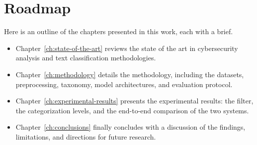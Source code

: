 \section*{Roadmap}\label{sec:roadmap}
Here is an outline of the chapters presented in this work, each with a brief.
\begin{itemize}
    \item Chapter~\ref{ch:state-of-the-art} reviews the state of the art in cybersecurity analysis and text classification methodologies.
    \item Chapter~\ref{ch:methodology} details the methodology, including the datasets, preprocessing, taxonomy, model architectures, and evaluation protocol.
    \item Chapter~\ref{ch:experimental-results} presents the experimental results: the filter, the categorization levels, and the end-to-end comparison of the two systems.
    \item Chapter~\ref{ch:conclusions} finally concludes with a discussion of the findings, limitations, and directions for future research.
\end{itemize}